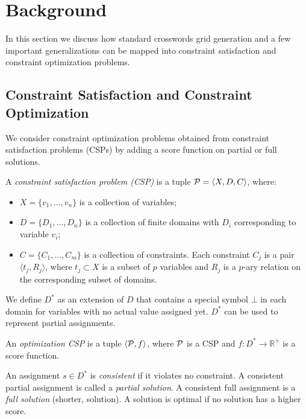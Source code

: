 

\section{Background}
\label{sec::background}

In this section we discuss how standard crosswords grid generation and a few important generalizations
can be mapped into constraint satisfaction and constraint optimization problems.

\subsection{Constraint Satisfaction and Constraint Optimization}

We consider constraint optimization problems
obtained from
constraint satisfaction problems (CSPs) by adding a score function on partial
or full solutions.

\bdf
A \emph{constraint satisfaction problem (CSP)} is a tuple ${\cal P} = \langle X, D, C \rangle$,
where:
\begin{itemize} 
\item $X = \{v_1, \dots, v_n\}$ is a collection of variables;
\item $D = \{D_1, \dots, D_n\}$ is a collection of finite domains with $D_i$ corresponding to variable $v_i$;
\item $C = \{C_1, \dots, C_m\}$ is a collection of constraints. Each constraint $C_j$ is a pair $\langle t_j, R_j \rangle$, where $t_j \subset X$ is a subset of $p$ variables and $R_j$ is a $p$-ary relation on the corresponding subset of domains.
\end{itemize}
\edf

\noindent We define $D^*$ as an extension of $D$ that contains a special symbol $\bot$ in each domain for variables with no actual value assigned yet. $D^*$ can be used to represent partial assignments.

\bdf
An \emph{optimization CSP} is a tuple $\langle {\cal P}, f \rangle$, 
where ${\cal P}$ is a CSP and 
$f : D^* \rightarrow \mathbb{R}^+$ is a score function.
\edf

An assignment $s \in D^*$ is {\em consistent} if 
it violates no constraint.
A consistent partial assignment is called a {\em partial solution}.
A consistent full assignment is a {\em full solution} (shorter, solution).
A solution is optimal if no solution has a higher score.

